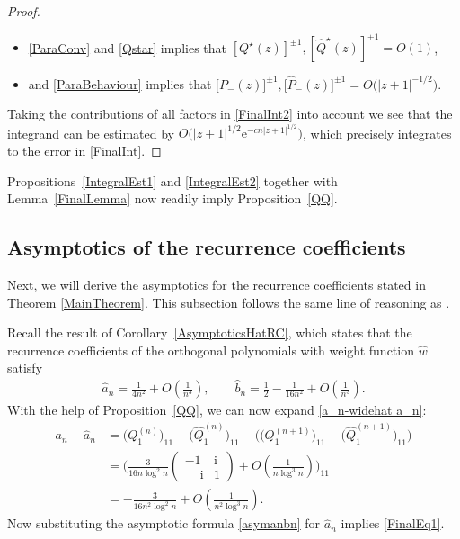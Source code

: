 \documentclass[11pt]{article}
\numberwithin{equation}{section}
\newcommand{\hw}{\widehat w}
\newcommand{\hQ}{{\widehat Q}}
\newcommand{\sbQ}{Q^\star}
\newcommand{\shQ}{{\widehat Q^\star}}
\newcommand{\bP}{P}
\newcommand{\hP}{{\widehat P}}
\newcommand{\hF}{\widehat F}
\newcommand{\Fw}{\frac{F^2}{w}}
\newcommand{\hFw}{\frac{\hF^2}{\hw}}
\newcommand{\I}{\mathrm{i}}
\newcommand{\E}{\mathrm{e}}
\numberwithin{equation}{section}
\begin{document}
\begin{proof}
\begin{itemize}
\begin{align*}
\begin{cases}
\begin{pmatrix}
 0 & 0
 \\
 \big(\Fw(s)-\hFw(s)\big)\phi^{-2n}(s) & 0
 \end{pmatrix}
 \\
 \quad= O\big(|s+1|^{3/2}\E^{-cn|s+1|^{1/2}}\big),\qquad s \in \Sigma^U \setminus (-1,1),
 \\
  0, \qquad s \in \Sigma^U \cap (-1,1),
 \end{cases}
 \end{align*}
 \item \eqref{ParaConv} and \eqref{Qstar} implies that $[\sbQ(z)]^{\pm 1}, [\shQ(z)]^{\pm 1} = O(1)$,
 \item and \eqref{ParaBehaviour} implies that $\big[\bP_-(z)\big]^{\pm 1}, \big[\hP_-(z)\big]^{\pm 1} = O\big(|z+1|^{-1/2}\big)$.
\end{itemize}
Taking the contributions of all factors in \eqref{FinalInt2} into account we see that the integrand can be estimated by $O\big(|z+1|^{1/2}\E^{-cn|z+1|^{1/2}}\big)$, which precisely integrates to the error in \eqref{FinalInt}.
\end{proof}

Propositions~\ref{IntegralEst1} and \ref{IntegralEst2} together with Lemma~\ref{FinalLemma} now readily imply Proposition~\ref{QQ}.

\subsection{Asymptotics of the recurrence coefficients}
Next, we will derive the asymptotics for the recurrence coefficients stated in Theorem \ref{MainTheorem}. This subsection follows the same line of reasoning as \cite[Section~5.2]{CD}.

Recall the result of Corollary~\ref{AsymptoticsHatRC}, which states that the recurrence coefficients of the orthogonal polynomials with weight function $\hw$ satisfy
\begin{align}\label{asymanbn}
\widehat a_n= \frac{1}{4n^2} + O\left(\frac{1}{n^3}\right),\qquad \widehat b_n = \frac{1}{2}-\frac{1}{16n^2} + O\left(\frac{1}{n^3}\right).
\end{align}
With the help of Proposition~\ref{QQ}, we can now expand \eqref{a_n-widehat a_n}:
\begin{align*}
 a_n -\widehat a_n &= \big(Q_1^{(n)}\big)_{11}-\big(\hQ_1^{(n)}\big)_{11} - \big(\big(Q_1^{(n+1)}\big)_{11}-\big(\hQ_1^{(n+1)}\big)_{11}\big)
 \\
 &= \Bigg( \frac{3}{16n \log^2n} \begin{pmatrix}
-1 & \I\\
\phantom{-}\I & 1
\end{pmatrix} + O\left(\frac{1}{n\log^3 n}\right) \Bigg)_{11}
\\&= -\frac{3}{16n^2\log^2 n} + O\left( \frac{1}{n^2\log^3 n}\right).
\end{align*}
Now substituting the asymptotic formula \eqref{asymanbn} for $\widehat a_n$ implies \eqref{FinalEq1}.
\end{document}
